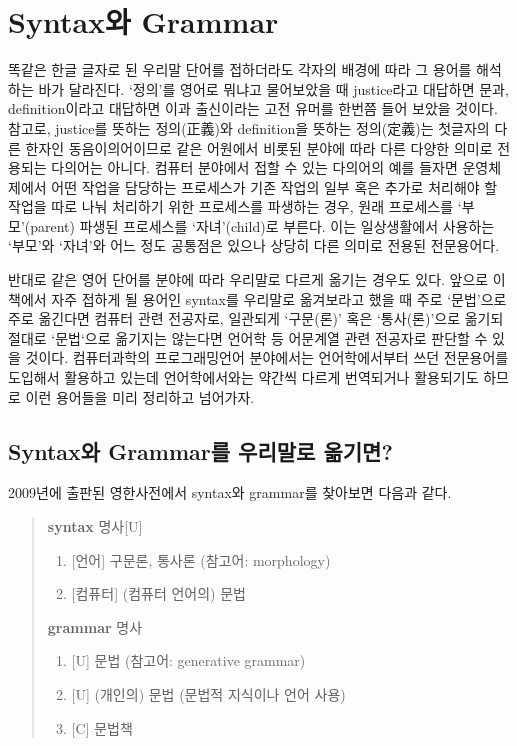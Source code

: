 
\chapter{Syntax와 Grammar}
\label{chap:SyntaxGrammar}
똑같은 한글 글자로 된 우리말 단어를 접하더라도 각자의 배경에 따라
그 용어를 해석하는 바가 달라진다. `정의'를 영어로 뭐냐고 물어보았을 때
justice라고 대답하면 문과, definition이라고 대답하면 이과 출신이라는
고전 유머를 한번쯤 들어 보았을 것이다. 참고로,
justice를 뜻하는 정의(正義)와 definition을 뜻하는 정의(定義)는
첫글자의 다른 한자인 동음이의어이므로 같은 어원에서 비롯된
분야에 따라 다른 다양한 의미로 전용되는 다의어는 아니다.
컴퓨터 분야에서 접할 수 있는 다의어의 예를 들자면 운영체제에서
어떤 작업을 담당하는 프로세스가 기존 작업의 일부 혹은 추가로
처리해야 할 작업을 따로 나눠 처리하기 위한 프로세스를 파생하는 경우,
원래 프로세스를 `부모'(parent) 파생된 프로세스를 `자녀'(child)로 부른다.
이는 일상생활에서 사용하는 `부모'와 `자녀'와 어느 정도 공통점은 있으나
상당히 다른 의미로 전용된 전문용어다.

반대로 같은 영어 단어를 분야에 따라 우리말로 다르게 옮기는 경우도 있다.
앞으로 이 책에서 자주 접하게 될 용어인 syntax를 우리말로 옮겨보라고
했을 때 주로 `문법'으로 주로 옮긴다면 컴퓨터 관련 전공자로,
일관되게 `구문(론)' 혹은 `통사(론)'으로 옮기되 절대로 `문법`으로
옮기지는 않는다면 언어학 등 어문계열 관련 전공자로 판단할 수 있을 것이다.
컴퓨터과학의 프로그래밍언어 분야에서는 언어학에서부터 쓰던 전문용어를
도입해서 활용하고 있는데 언어학에서와는 약간씩 다르게 번역되거나
활용되기도 하므로 이런 용어들을 미리 정리하고 넘어가자.


\section{Syntax와 Grammar를 우리말로 옮기면?}

2009년에 출판된 영한사전\cite{OxEKdict}에서 syntax와 grammar를 찾아보면 다음과 같다.
\begin{quote}
    \textbf{syntax} 명사[U] \vspace{-1ex}
    \begin{enumerate}\tightlist
    \item{} [언어] 구문론, 통사론 (참고어: morphology)
    \item{} [컴퓨터] (컴퓨터 언어의) 문법
    \end{enumerate}
    \textbf{grammar} 명사 \vspace{-1ex}
    \begin{enumerate}\tightlist
    \item{} [U] 문법 (참고어: generative grammar)
    \item{} [U] (개인의) 문법 (문법적 지식이나 언어 사용)
    \item{} [C] 문법책
    \end{enumerate}
\end{quote}

